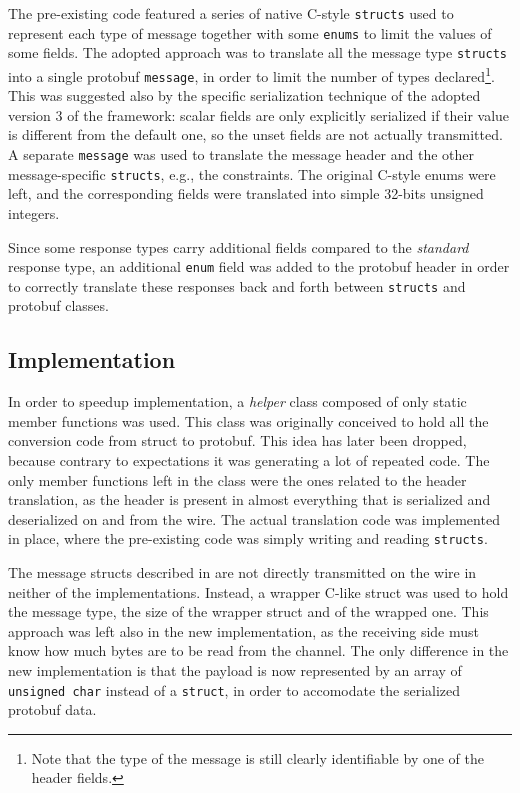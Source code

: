 The pre-existing code featured a series of native C-style \texttt{structs} used to represent each type of message together with some \texttt{enums} to limit the values of some fields. The adopted approach was to translate all the message type \texttt{structs} into a single protobuf \texttt{message}, in order to limit the number of types declared\footnote{Note that the type of the message is still clearly identifiable by one of the header fields.}. This was suggested also by the specific serialization technique of the adopted version 3 of the framework: scalar fields are only explicitly serialized if their value is different from the default one, so the unset fields are not actually transmitted. A separate \texttt{message} was used to translate the message header and the other message-specific \texttt{structs}, e.g.,  the constraints. The original C-style enums were left, and the corresponding fields were translated into simple 32-bits unsigned integers.

Since some response types carry additional fields compared to the \emph{standard} response type, an additional \texttt{enum} field was added to the protobuf header in order to correctly translate these responses back and forth between \texttt{structs} and protobuf classes.

\subsection{Implementation}

In order to speedup implementation, a \emph{helper} class composed of only static member functions was used. This class was originally conceived to hold all the conversion code from struct to protobuf. This idea has later been dropped, because contrary to expectations it was generating a lot of repeated code. The only member functions left in the class were the ones related to the header translation, as the header is present in almost everything that is serialized and deserialized on and from the wire. The actual translation code was implemented in place, where the pre-existing code was simply writing and reading \texttt{structs}.

The message structs described in  are not directly transmitted on the wire in neither of the implementations. Instead, a wrapper C-like struct was used to hold the message type, the size of the wrapper struct and of the wrapped one. This approach was left also in the new implementation, as the receiving side must know how much bytes are to be read from the channel. The only difference in the new implementation is that the payload is now represented by an array of \texttt{unsigned char} instead of a \texttt{struct}, in order to accomodate the serialized protobuf data.


